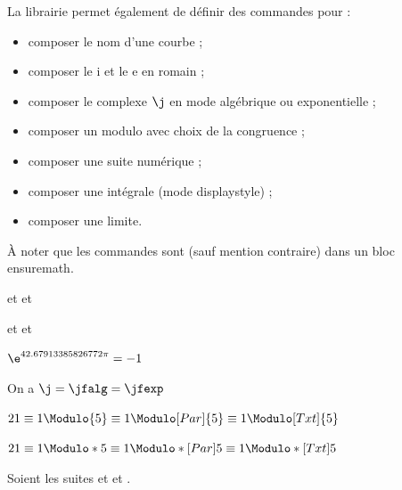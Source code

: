 \begin{tipblock}
La librairie  permet également de définir des commandes pour :

\begin{itemize}
	\item composer le nom d'une courbe ;
	\item composer le \og i \fg{} et le \og e \fg{} en romain ;
	\item composer le complexe $\j$ en mode algébrique ou exponentielle ;
	\item composer un modulo avec choix de la congruence ;
	\item composer une suite numérique ;
	\item composer une intégrale (mode \textsf{displaystyle}) ;
	\item {} composer une limite.
\end{itemize}

À noter que les commandes sont (sauf mention contraire) dans un bloc \textsf{ensuremath}.
\end{tipblock}

\begin{PresCodeTexPL}{}

\Courbe et \Courbe[f] et \Courbe[g^{-1}]

\Courbe* et \Courbe*[f] et \Courbe*[g^{-1}]
\end{PresCodeTexPL}

\begin{PresCodeTexPL}{}
$\e^{\i \pi} = -1$
\end{PresCodeTexPL}

\begin{PresCodeTexPL}{}
On a $\j = \jfalg = \jfexp$
\end{PresCodeTexPL}

\begin{PresCodeTexPL}{}
$21 \equiv 1 \Modulo{5} \equiv 1 \Modulo[Par]{5} \equiv 1 \Modulo[Txt]{5}$

$21 \equiv 1 \Modulo*{5} \equiv 1 \Modulo*[Par]{5} \equiv 1 \Modulo*[Txt]{5}$
\end{PresCodeTexPL}

\begin{PresCodeTexPL}{}
Soient les suites  et  et \Suite[q]{\Omega}.
\end{PresCodeTexPL}

